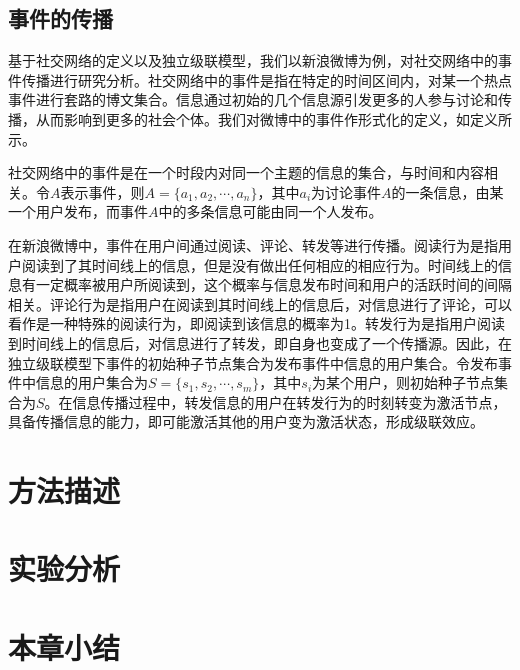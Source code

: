 \subsection{事件的传播}
\label{subsec5:affair}
基于社交网络的定义以及独立级联模型，我们以新浪微博为例，对社交网络中的事件传播进行研究分析。社交网络中的事件是指在特定的时间区间内，对某一个热点事件进行套路的博文集合。信息通过初始的几个信息源引发更多的人参与讨论和传播，从而影响到更多的社会个体。我们对微博中的事件作形式化的定义，如定义所示。

\begin{mydef}[事件]
\label{def:event}
社交网络中的事件是在一个时段内对同一个主题的信息的集合，与时间和内容相关。令$A$表示事件，则$A=\{a_1, a_2, \cdots, a_n\}$，其中$a_i$为讨论事件$A$的一条信息，由某一个用户发布，而事件$A$中的多条信息可能由同一个人发布。
\end{mydef}

在新浪微博中，事件在用户间通过阅读、评论、转发等进行传播。阅读行为是指用户阅读到了其时间线上的信息，但是没有做出任何相应的相应行为。时间线上的信息有一定概率被用户所阅读到，这个概率与信息发布时间和用户的活跃时间的间隔相关。评论行为是指用户在阅读到其时间线上的信息后，对信息进行了评论，可以看作是一种特殊的阅读行为，即阅读到该信息的概率为1。转发行为是指用户阅读到时间线上的信息后，对信息进行了转发，即自身也变成了一个传播源。因此，在独立级联模型下事件的初始种子节点集合为发布事件中信息的用户集合。令发布事件中信息的用户集合为$S=\{s_1,s_2,\cdots,s_m\}$，其中$s_i$为某个用户，则初始种子节点集合为$S$。在信息传播过程中，转发信息的用户在转发行为的时刻转变为激活节点，具备传播信息的能力，即可能激活其他的用户变为激活状态，形成级联效应。
\section{方法描述}
\label{sec5:method}

\section{实验分析}
\label{sec5:experiment}

\section{本章小结}
\label{sec5:conclusion}